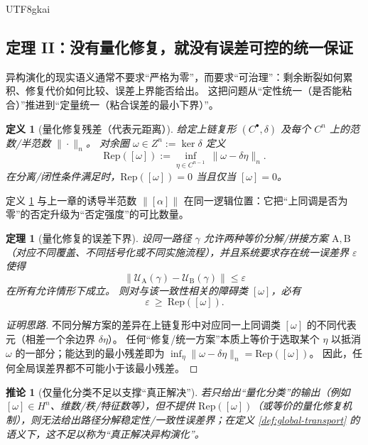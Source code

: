 \documentclass[12pt]{article}
\newtheorem{definition}{定义}[section]
\newtheorem{theorem}{定理}[section]
\newtheorem{corollary}{推论}[section]
\begin{document}
\begin{CJK*}{UTF8}{gkai}
\subsection{定理 II：没有量化修复，就没有误差可控的统一保证}

异构演化的现实语义通常不要求“严格为零”，而要求“可治理”：剩余断裂如何累积、修复代价如何比较、误差上界能否给出。
这把问题从“定性统一（是否能粘合）”推进到“定量统一（粘合误差的最小下界）”。

\begin{definition}[量化修复残差（代表元距离）]\label{def:Rep}
给定上链复形 $(C^\bullet,\delta)$ 及每个 $C^n$ 上的范数/半范数 $\|\cdot\|_n$。
对余圈 $\omega\in Z^n:=\ker\delta$ 定义
\[
  \mathrm{Rep}([\omega])
  :=
  \inf_{\eta\in C^{n-1}}\ \|\omega-\delta\eta\|_n.
\]
在分离/闭性条件满足时，$\mathrm{Rep}([\omega])=0$ 当且仅当 $[\omega]=0$。
\end{definition}

定义 \ref{def:Rep} 与上一章的诱导半范数 $\|[\alpha]\|$ 在同一逻辑位置：它把“上同调是否为零”的否定升级为“否定强度”的可比数量。

\begin{theorem}[量化修复的误差下界]\label{thm:quant-lower-bound}
设同一路径 $\gamma$ 允许两种等价分解/拼接方案 $\mathrm{A},\mathrm{B}$（对应不同覆盖、不同括号化或不同实施流程），并且系统要求存在统一误差界 $\varepsilon$ 使得
\[
  \bigl\|\mathcal{U}_{\mathrm{A}}(\gamma)-\mathcal{U}_{\mathrm{B}}(\gamma)\bigr\|\le \varepsilon
\]
在所有允许情形下成立。
则对与该一致性相关的障碍类 $[\omega]$，必有
\[
  \varepsilon\ \ge\ \mathrm{Rep}([\omega]).
\]
\end{theorem}

\begin{proof}[证明思路]
不同分解方案的差异在上链复形中对应同一上同调类 $[\omega]$ 的不同代表元（相差一个余边界 $\delta\eta$）。
任何“修复/统一方案”本质上等价于选取某个 $\eta$ 以抵消 $\omega$ 的一部分；能达到的最小残差即为 $\inf_\eta\|\omega-\delta\eta\|_n=\mathrm{Rep}([\omega])$。
因此，任何全局误差界都不可能小于该最小残差。
\end{proof}

\begin{corollary}[仅量化分类不足以支撑“真正解决”]\label{cor:quant-class-not-enough}
若只给出“量化分类”的输出（例如 $[\omega]\in H^n$、维数/秩/特征数等），但不提供 $\mathrm{Rep}([\omega])$（或等价的量化修复机制），则无法给出路径分解稳定性/一致性误差界；在定义 \ref{def:global-transport} 的语义下，这不足以称为“真正解决异构演化”。
\end{corollary}


\end{CJK*}
\end{document}
